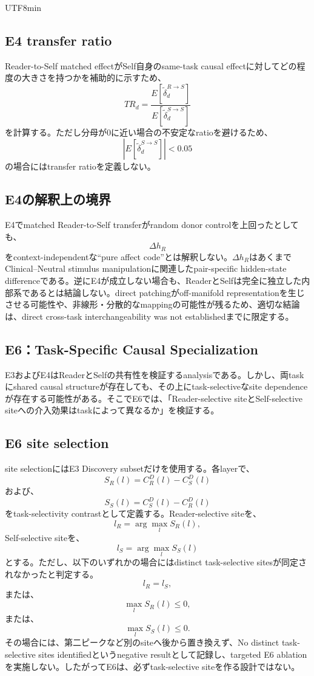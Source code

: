 \documentclass{article} %
\begin{document}
\begin{CJK*}{UTF8}{min}
\subsection{E4 transfer ratio}

Reader-to-Self matched effectがSelf自身のsame-task causal effectに対してどの程度の大きさを持つかを補助的に示すため、
\[
TR_d
=
\frac{
E[
\widetilde{\delta}^{R\rightarrow S}_d
]
}{
E[
\widetilde{\delta}^{S\rightarrow S}_d
]
}
\]
を計算する。ただし分母が0に近い場合の不安定なratioを避けるため、
\[
\left|
E[
\widetilde{\delta}^{S\rightarrow S}_d
]
\right|
<0.05
\]
の場合にはtransfer ratioを定義しない。


\subsection{E4の解釈上の境界}

E4でmatched Reader-to-Self transferがrandom donor controlを上回ったとしても、
\[
\Delta h_R
\]
をcontext-independentな``pure affect code''とは解釈しない。\(\Delta h_R\)はあくまで
Clinical--Neutral stimulus manipulationに関連したpair-specific hidden-state differenceである。逆にE4が成立しない場合も、ReaderとSelfは完全に独立した内部系であるとは結論しない。direct patchingがoff-manifold representationを生じさせる可能性や、非線形・分散的なmappingの可能性が残るため、適切な結論は、direct cross-task interchangeability was not establishedまでに限定する。


\subsection{E6：Task-Specific Causal Specialization}
\label{app:v1-e6}

E3およびE4はReaderとSelfの共有性を検証するanalysisである。しかし、両taskにshared causal structureが存在しても、その上にtask-selectiveなsite dependenceが存在する可能性がある。そこでE6では、「Reader-selective siteとSelf-selective siteへの介入効果はtaskによって異なるか」を検証する。


\subsection{E6 site selection}

site selectionにはE3 Discovery subsetだけを使用する。各layerで、
\[
S_R(l)
=
C_R^{D}(l)
-
C_S^{D}(l)
\]
および、
\[
S_S(l)
=
C_S^{D}(l)
-
C_R^{D}(l)
\]
をtask-selectivity contrastとして定義する。Reader-selective siteを、
\[
l_R
=
\arg\max_l S_R(l),
\]
Self-selective siteを、
\[
l_S
=
\arg\max_l S_S(l)
\]
とする。ただし、以下のいずれかの場合にはdistinct task-selective sitesが同定されなかったと判定する。
\[
l_R=l_S,
\]
または、
\[
\max_l S_R(l)\le0,
\]
または、
\[
\max_l S_S(l)\le0.
\]
その場合には、第二ピークなど別のsiteへ後から置き換えず、No distinct task-selective sites identifiedというnegative resultとして記録し、targeted E6 ablationを実施しない。したがってE6は、必ずtask-selective siteを作る設計ではない。



\end{CJK*}
\end{document}
